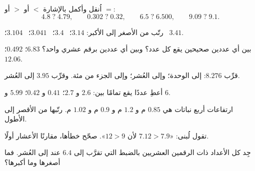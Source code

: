 \begin{exercise}[$\star$]\label{exo:g5:decimals:4}
اُنقل وأكمل بالإشارة $<$ أو $>$ أو $=$:
\[
4.8 \;?\; 4.79, \qquad
0.302 \;?\; 0.32, \qquad
6.5 \;?\; 6.500, \qquad
9.09 \;?\; 9.1 .
\]
\end{exercise}

\begin{exercise}[$\star$]\label{exo:g5:decimals:5}
رتّب من الأصغر إلى الأكبر: $3.14$؛ \ $3.4$؛ \ $3.041$؛ \
$3.104$؛ \ $3.41$.
\end{exercise}

\begin{exercise}[$\star$]\label{exo:g5:decimals:6}
بين أي عددين صحيحين يقع كل عدد؟ وبين أي عددين برقم عشري
واحد؟ \quad $6.83$؛ \quad $0.492$؛ \quad
$12.06$.
\end{exercise}

\begin{exercise}[$\star$]\label{exo:g5:decimals:7}
قرِّب $8.276$: إلى الوحدة؛ وإلى العُشر؛ وإلى الجزء من مئة. وقرِّب
$3.95$ إلى العُشر.
\end{exercise}

\begin{exercise}[$\star$]\label{exo:g5:decimals:8}
أعطِ عددًا يقع تمامًا بين: $2.6$ و $2.7$؛ \quad $0.41$ و
$0.42$؛ \quad $5.99$ و $6$.
\end{exercise}

\begin{exercise}[$\star$]\label{exo:g5:decimals:9}
ارتفاعات أربع نباتات هي $0.85$ م و $1.2$ م و $0.9$ م و
$1.02$ م. رتّبها من الأقصر إلى الأطول.
\end{exercise}

\begin{exercise}[$\star\star$]\label{exo:g5:decimals:10}
تقول لُبنى: «$7.12 > 7.9$ لأن $12 > 9$». صحّح خطأها،
مقارنًا الأعشار أولًا.
\end{exercise}

\begin{exercise}[$\star\star$]\label{exo:g5:decimals:11}
جِد كل الأعداد ذات الرقمين العشريين بالضبط التي تقرَّب إلى
$6.4$ عند  إلى العُشر. فما أصغرها وما
أكبرها؟
\end{exercise}
